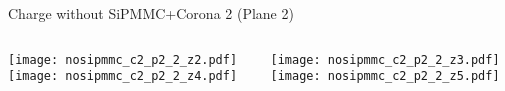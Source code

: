 \documentclass{beamer}
\begin{document}
\begin{frame}{Charge without SiPMMC+Corona 2 (Plane 2)}
	\begin{columns}[onlytextwidth]
		\begin{column}{0.5\textwidth}
			\texttt{[image: nosipmmc\_c2\_p2\_2\_z2.pdf]} \\
			\texttt{[image: nosipmmc\_c2\_p2\_2\_z4.pdf]}
		 \end{column}
		 \begin{column}{0.5\textwidth}
			\texttt{[image: nosipmmc\_c2\_p2\_2\_z3.pdf]} \\
			\texttt{[image: nosipmmc\_c2\_p2\_2\_z5.pdf]}
		 \end{column}
 \end{columns}
\end{frame}
\end{document}
